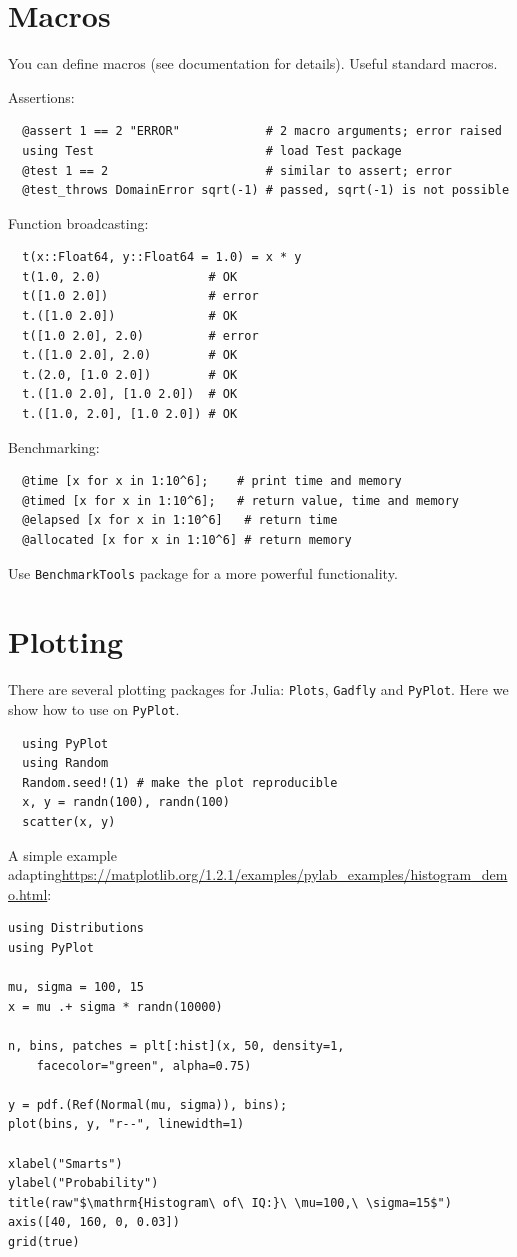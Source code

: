 \documentclass[10pt,a4paper]{article}
\begin{document}
\section{Macros}
You can define macros (see documentation for details). Useful standard macros.

Assertions:
\begin{lstlisting}
  @assert 1 == 2 "ERROR"            # 2 macro arguments; error raised
  using Test                        # load Test package
  @test 1 == 2                      # similar to assert; error
  @test_throws DomainError sqrt(-1) # passed, sqrt(-1) is not possible
\end{lstlisting}

Function broadcasting:
\begin{lstlisting}
  t(x::Float64, y::Float64 = 1.0) = x * y
  t(1.0, 2.0)               # OK
  t([1.0 2.0])              # error
  t.([1.0 2.0])             # OK
  t([1.0 2.0], 2.0)         # error
  t.([1.0 2.0], 2.0)        # OK
  t.(2.0, [1.0 2.0])        # OK
  t.([1.0 2.0], [1.0 2.0])  # OK
  t.([1.0, 2.0], [1.0 2.0]) # OK
\end{lstlisting}

Benchmarking:
\begin{lstlisting}
  @time [x for x in 1:10^6];    # print time and memory
  @timed [x for x in 1:10^6];   # return value, time and memory
  @elapsed [x for x in 1:10^6]   # return time
  @allocated [x for x in 1:10^6] # return memory
\end{lstlisting}
Use \lstinline|BenchmarkTools| package for a more powerful functionality.

\section{Plotting}
There are several plotting packages for Julia: \lstinline|Plots|, \lstinline|Gadfly| and \lstinline|PyPlot|.
Here we show how to use on \lstinline|PyPlot|.
\begin{lstlisting}
  using PyPlot
  using Random
  Random.seed!(1) # make the plot reproducible
  x, y = randn(100), randn(100)
  scatter(x, y)
\end{lstlisting}

A simple example adapting\newline\url{https://matplotlib.org/1.2.1/examples/pylab_examples/histogram_demo.html}:
\begin{lstlisting}
using Distributions
using PyPlot

mu, sigma = 100, 15
x = mu .+ sigma * randn(10000)

n, bins, patches = plt[:hist](x, 50, density=1,
    facecolor="green", alpha=0.75)

y = pdf.(Ref(Normal(mu, sigma)), bins);
plot(bins, y, "r--", linewidth=1)

xlabel("Smarts")
ylabel("Probability")
title(raw"$\mathrm{Histogram\ of\ IQ:}\ \mu=100,\ \sigma=15$")
axis([40, 160, 0, 0.03])
grid(true)
\end{lstlisting}
\end{document}

